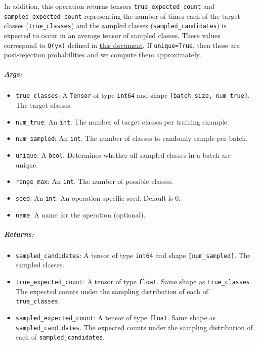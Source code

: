 In addition, this operation returns tensors
\texttt{true\_expected\_count} and \texttt{sampled\_expected\_count}
representing the number of times each of the target classes
(\texttt{true\_classes}) and the sampled classes
(\texttt{sampled\_candidates}) is expected to occur in an average tensor
of sampled classes. These values correspond to \texttt{Q(y\textbar{}x)}
defined in
\href{http://www.tensorflow.org/extras/candidate_sampling.pdf}{this
document}. If \texttt{unique=True}, then these are post-rejection
probabilities and we compute them approximately.

\subparagraph{Args: }\label{args-27}

\begin{itemize}
\tightlist
\item
  \texttt{true\_classes}: A \texttt{Tensor} of type \texttt{int64} and
  shape \texttt{{[}batch\_size,\ num\_true{]}}. The target classes.
\item
  \texttt{num\_true}: An \texttt{int}. The number of target classes per
  training example.
\item
  \texttt{num\_sampled}: An \texttt{int}. The number of classes to
  randomly sample per batch.
\item
  \texttt{unique}: A \texttt{bool}. Determines whether all sampled
  classes in a batch are unique.
\item
  \texttt{range\_max}: An \texttt{int}. The number of possible classes.
\item
  \texttt{seed}: An \texttt{int}. An operation-specific seed. Default is
  0.
\item
  \texttt{name}: A name for the operation (optional).
\end{itemize}

\subparagraph{Returns: }\label{returns-27}

\begin{itemize}
\tightlist
\item
  \texttt{sampled\_candidates}: A tensor of type \texttt{int64} and
  shape \texttt{{[}num\_sampled{]}}. The sampled classes.
\item
  \texttt{true\_expected\_count}: A tensor of type \texttt{float}. Same
  shape as \texttt{true\_classes}. The expected counts under the
  sampling distribution of each of \texttt{true\_classes}.
\item
  \texttt{sampled\_expected\_count}: A tensor of type \texttt{float}.
  Same shape as \texttt{sampled\_candidates}. The expected counts under
  the sampling distribution of each of \texttt{sampled\_candidates}.
\end{itemize}

